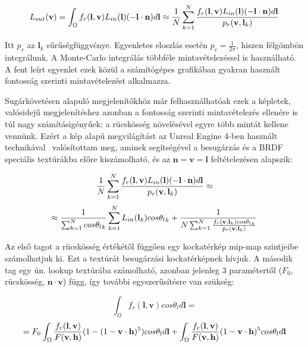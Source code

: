 \[
L_{out}(\mathbf{v}) = \int_{\Omega} { f_r(\mathbf{l}, \mathbf{v}) L_{in}(\mathbf{l})(-\mathbf{l} \cdot \mathbf{n}) d\mathbf{l} } \approx { 1 \over N } \sum_{k=1}^{N} { { f_r(\mathbf{l}, \mathbf{v}) L_{in}(\mathbf{l})(-\mathbf{l} \cdot \mathbf{n}) d\mathbf{l} } \over { p_r(\mathbf{v}, \mathbf{l}_k) } }
\]

Itt \(p_r\) az \(\mathbf{l}_k\) sűrűségfüggvénye. Egyenletes eloszlás esetén \(p_r = \frac{1}{2\pi}\), hiszen félgömbön integrálunk. A Monte-Carlo integrálás többféle mintavételezéssel is használható. A fent leírt egyenlet ezek közül a számítógépes grafikában gyakran használt fontosság szerinti mintavételezést alkalmazza.

Sugárkövetésen alapuló megjelenítőkhöz már felhasználhatóak ezek a képletek, valósidejű megjelenítéshez azonban a fontosság szerinti mintavételezés ellenére is túl nagy számításigényűek: a rücskösség növelésével egyre több mintát kellene vennünk. Ezért a kép alapú megvilágítást az Unreal Engine 4-ben használt technikával~\cite{karis2013real} valósítottam meg, aminek segítségével a besugárzás és a BRDF speciális textúrákba előre kiszámolható, és az \(\mathbf{n} = \mathbf{v} = \mathbf{l}\) feltételezésen alapszik:

\[
{ 1 \over N } \sum_{k=1}^{N} { { f_r(\mathbf{l}, \mathbf{v}) L_{in}(\mathbf{l})(-\mathbf{l} \cdot \mathbf{n}) d\mathbf{l} } \over { p_r(\mathbf{v}, \mathbf{l}_k) } } \approx
\]
\[
\approx { { 1 \over \sum_{k=1}^{N} cos{\theta_l}_k } \sum_{k=1}^{N} L_{in}(\mathbf{l}_k)cos{\theta_l}_k } + { 1 \over N \sum_{k=1}^{N} { { f_r(\mathbf{v}, \mathbf{l}_k) cos{\theta_l}_k} \over { p_r(\mathbf{v}, \mathbf{l}_k) } } }
\]

Az első tagot a rücskösség értékétől függően egy kockatérkép mip-map szintjeibe számolhatjuk ki. Ezt a textúrát besugárzási kockatérképnek hívjuk. A második tag egy ún. lookup textúrába számolható, azonban jelenleg 3 paramétertől (\(F_0\), rücskösség, \(\mathbf{n} \cdot \mathbf{v}\)) függ, így további egyszerűsítésre van szükség:

\[
\int_{\Omega} { f_r(\mathbf{l}, \mathbf{v}) cos\theta_l d\mathbf{l} } =
\]
\[= F_0 \int_{\Omega} { { f_r(\mathbf{l}, \mathbf{v}) \over F(\mathbf{v}, \mathbf{h}) } (1 - (1 - \mathbf{v} \cdot \mathbf{h})^5) cos\theta_l d\mathbf{l} } + \int_{\Omega} { { f_r(\mathbf{l}, \mathbf{v}) \over F(\mathbf{v}, \mathbf{h}) } (1 - \mathbf{v} \cdot \mathbf{h})^5 cos\theta_l d\mathbf{l} }
\]

\vspace{5pt}

